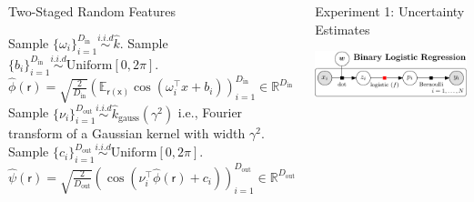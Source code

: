 \documentclass[english]{beamer}
\begin{document}
\begin{frame}
\begin{columns}[t]
\begin{block}{Two-Staged Random Features }
\begin{algorithmic}[1]
\STATE Sample  $\{ \omega_i \}_{i=1}^{D_\mathrm{in}} \overset{i.i.d}{\sim} \hat{k}$.
\STATE Sample $\{b_i\}_{i=1}^{D_\mathrm{in}} \overset{i.i.d}{\sim} \text{Uniform}[0, 2\pi] $.
\STATE $\hat{\phi}(\mathsf{r}) = \sqrt{\frac{2}{D_\mathrm{in}}} \left( \mathbb{E}_{\mathsf{r(x)}} 
\cos(\omega_{i}^{\top}x+b_{i} ) \right)_{i=1}^{D_\mathrm{in}} \in \mathbb{R}^{D_\mathrm{in}}$ \\
%
%
\STATE Sample $\{ \nu_i \}_{i=1}^{D_\mathrm{out}} \overset{i.i.d}{\sim}
\hat{k}_{\text{gauss}}(\gamma^{2})$
i.e., Fourier transform of a Gaussian kernel with width $\gamma^2$.
\STATE Sample $\{c_i\}_{i=1}^{D_\mathrm{out}} \overset{i.i.d}{\sim} \text{Uniform}[0, 2\pi] $.
\STATE $\hat{\psi}(\mathsf{r}) = \sqrt{\frac{2}{D_\mathrm{out}}} \left(  
\cos(\nu_{i}^{\top} \hat{\phi}(\mathsf{r}) + c_{i} ) \right)_{i=1}^{D_\mathrm{out}} \in 
\mathbb{R}^{D_\mathrm{out}}$
\end{algorithmic}

\end{block}

\begin{block}{ Experiment 1: Uncertainty Estimates}

\begin{itemize}

\begin{center}
\includegraphics[width=20cm]{img/binlog_graph_title-crop}
\end{center}


\end{itemize}
\end{block}
\end{columns}
\end{frame}
\end{document}
